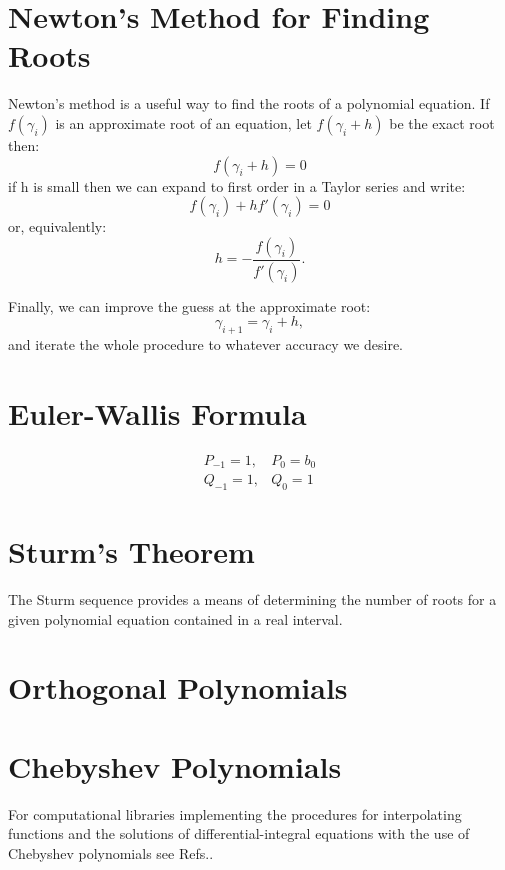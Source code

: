 \section{Newton's Method for Finding Roots}
Newton's method is a useful way to find the roots of a polynomial
equation. If $f(\gamma_i)$ is an approximate root of an equation,
let $f(\gamma_i+h)$ be the exact root then:
%
\begin{equation}
f(\gamma_i+h)=0
\end{equation}
%
if h is small then we can expand to first order in a 
Taylor series and write:
\begin{equation}
f(\gamma_i) + h f'(\gamma_{i})= 0
\end{equation}
%
or, equivalently:
%
\begin{equation}
h = -\frac{f(\gamma_{i})}{f'(\gamma_i)}.
\end{equation}

Finally, we can improve the guess at the approximate root:
%
\begin{equation}
\gamma_{i+1} =  \gamma_{i} + h,
\end{equation}
%
and iterate the whole procedure to whatever accuracy we desire.

\section{Euler-Wallis Formula}

\begin{align}
P_{-1} = 1, & P_{0}= b_{0} \\
Q_{-1} = 1, & Q_{0}= 1 
\end{align}

\section{Sturm's Theorem}
The Sturm sequence provides a means of determining the number of 
roots for a given polynomial equation contained in a real interval.

\section{Orthogonal Polynomials}

\section{Chebyshev Polynomials}

For computational libraries implementing the procedures
for interpolating functions and the solutions of differential-integral
equations with the use of Chebyshev polynomials see Refs.\cite{nex80,daguano83}.

